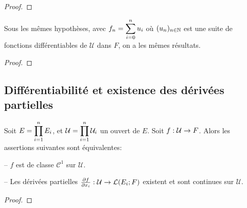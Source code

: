 \ifdefined\outputproof
\begin{proof}

\end{proof}
\fi

\begin{corollary}
	Sous les mêmes hypothèses, avec $f_{n} = \displaystyle \sum_{i = 0}^{n} u_{i}$ où
	$(u_{n})_{n \in \mathbb{N}}$ est une suite de fonctions différentiables de
	$\mathcal{U}$ dans $F$, on a les mêmes résultats.
\end{corollary}

\ifdefined\outputproof
\begin{proof}

\end{proof}
\fi

\subsection{Différentiabilité et existence des dérivées partielles}

\begin{theorem}
\label{theorem_partial_derivative_existence}

	Soit $E = \displaystyle \prod_{i = 1}^{n} E_{i}$, et $\mathcal{U} =
	\displaystyle \prod_{i = 1}^{n} \mathcal{U}_{i}$ un ouvert de $E$.
	Soit $f : \mathcal{U} \rightarrow F$.
	Alors les assertions suivantes sont équivalentes:

	-- $f$ est de classe $\mathcal{C}^{1}$ sur $\mathcal{U}$.

	-- Les dérivées partielles
	$\pdv{f}{x_{i}} : \mathcal{U} \rightarrow \mathcal{L}(E_{i}; F)$
	existent et sont continues sur $\mathcal{U}$.
\end{theorem}

\ifdefined\outputproof
\begin{proof}

\end{proof}
\fi
